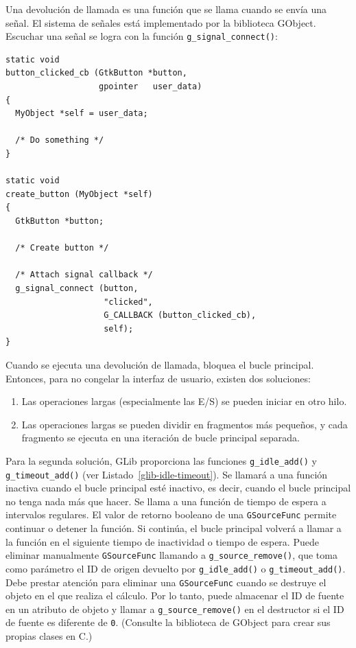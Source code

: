 Una devolución de llamada es una función que se llama cuando se envía una señal. El sistema de señales está implementado por la biblioteca GObject. Escuchar una señal se logra con la función \lstinline{g_signal_connect()}:

\begin{lstlisting}[style=GLib/GTK]
static void
button_clicked_cb (GtkButton *button,
                   gpointer   user_data)
{
  MyObject *self = user_data;

  /* Do something */
}

static void
create_button (MyObject *self)
{
  GtkButton *button;

  /* Create button */

  /* Attach signal callback */
  g_signal_connect (button,
                    "clicked",
                    G_CALLBACK (button_clicked_cb),
                    self);
}
\end{lstlisting}

Cuando se ejecuta una devolución de llamada, bloquea el bucle principal. Entonces, para no congelar la interfaz de usuario, existen dos soluciones:

\begin{enumerate}
    \item Las operaciones largas (especialmente las E/S) se pueden iniciar en otro hilo.
    \item Las operaciones largas se pueden dividir en fragmentos más pequeños, y cada fragmento se ejecuta en una iteración de bucle principal separada.
\end{enumerate}

Para la segunda solución, GLib proporciona las funciones \lstinline{g_idle_add()} y \lstinline{g_timeout_add()} (ver Listado~\ref{glib-idle-timeout}). Se llamará a una función inactiva cuando el bucle principal esté inactivo, es decir, cuando el bucle principal no tenga nada más que hacer. Se llama a una función de tiempo de espera a intervalos regulares. El valor de retorno booleano de una \lstinline{GSourceFunc} permite continuar o detener la función. Si continúa, el bucle principal volverá a llamar a la función en el siguiente tiempo de inactividad o tiempo de espera. Puede eliminar manualmente \lstinline{GSourceFunc} llamando a \lstinline{g_source_remove()}, que toma como parámetro el ID de origen devuelto por \lstinline{g_idle_add()} o \lstinline{g_timeout_add()}. Debe prestar atención para eliminar una \lstinline{GSourceFunc} cuando se destruye el objeto en el que realiza el cálculo. Por lo tanto, puede almacenar el ID de fuente en un atributo de objeto y llamar a \lstinline{g_source_remove()} en el destructor si el ID de fuente es diferente de \lstinline{0}. (Consulte la biblioteca de GObject para crear sus propias clases en C.)

